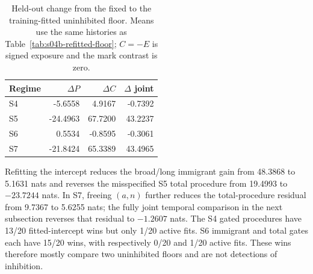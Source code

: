 \begin{table}[htbp]\centering\small
\caption{Held-out change from the fixed to the training-fitted uninhibited floor. Means use the same histories as Table~\ref{tab:s04b-refitted-floor}; $C=-E$ is signed exposure and the mark contrast is zero.}\label{tab:s04b-floor-components}
\begin{tabular}{@{}lrrr@{}}\toprule Regime & $\Delta P$ & $\Delta C$ & $\Delta$ joint\\\midrule
S4 & -5.6558 & 4.9167 & -0.7392\\
S5 & -24.4963 & 67.7200 & 43.2237\\
S6 & 0.5534 & -0.8595 & -0.3061\\
S7 & -21.8424 & 65.3389 & 43.4965\\
\bottomrule\end{tabular}\end{table}

Refitting the intercept reduces the broad/long immigrant gain from 48.3868 to 5.1631 nats and reverses the misspecified S5 total procedure from 19.4993 to $-23.7244$ nats. In S7, freeing $(a,n)$ further reduces the total-procedure residual from 9.7367 to 5.6255 nats; the fully joint temporal comparison in the next subsection reverses that residual to $-1.2607$ nats. The S4 gated procedures have 13/20 fitted-intercept wins but only 1/20 active fits. S6 immigrant and total gates each have 15/20 wins, with respectively 0/20 and 1/20 active fits. These wins therefore mostly compare two uninhibited floors and are not detections of inhibition.
